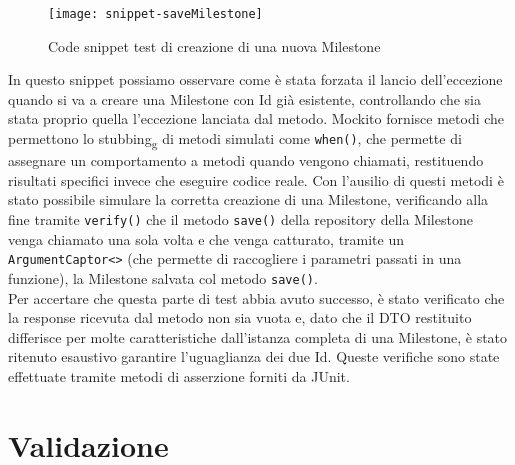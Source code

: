\begin{figure}[H] 
    \centering 
    \texttt{[image: snippet-saveMilestone]} 
    \caption{Code snippet test di creazione di una nuova Milestone}
\end{figure}

\noindent In questo snippet possiamo osservare come è stata forzata il lancio dell’eccezione quando si va a creare una Milestone con Id già esistente, controllando che sia stata proprio quella l’eccezione lanciata dal metodo. Mockito fornisce metodi che permettono lo stubbing\textsubscript{g} di metodi simulati come \texttt{when()}, che permette di assegnare un comportamento a metodi quando vengono chiamati, restituendo risultati specifici invece che eseguire codice reale. Con l’ausilio di questi metodi è stato possibile simulare la corretta creazione di una Milestone, verificando alla fine tramite \texttt{verify()} che il metodo \texttt{save()} della repository della Milestone venga chiamato una sola volta e che venga catturato, tramite un \texttt{ArgumentCaptor<>} (che permette di raccogliere i parametri passati in una funzione), la Milestone salvata col metodo \texttt{save()}.\\
Per accertare che questa parte di test abbia avuto successo, è stato verificato che la response ricevuta dal metodo non sia vuota e, dato che il DTO restituito differisce per molte caratteristiche dall’istanza completa di una Milestone, è stato ritenuto esaustivo garantire l’uguaglianza dei due Id. Queste verifiche sono state effettuate tramite metodi di asserzione forniti da JUnit.

\section{Validazione}
